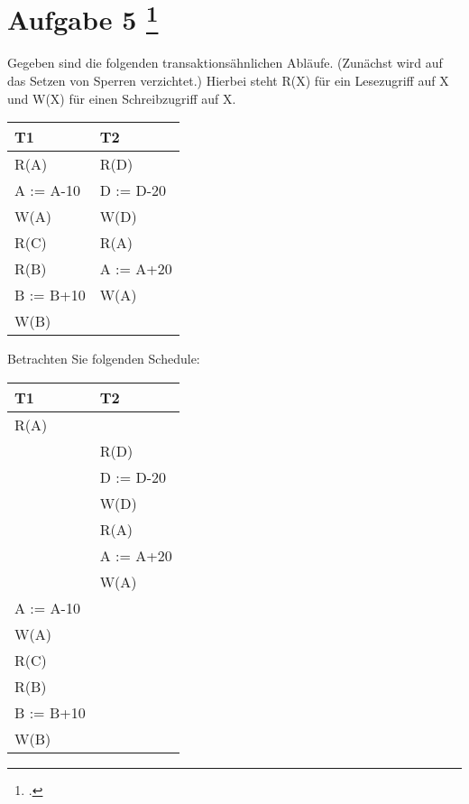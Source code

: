 \documentclass{lehramt-informatik-aufgabe}
\begin{document}
\liAufgabenTitel{}
\section{Aufgabe 5
\footcite{66116:2021:03}}

Gegeben sind die folgenden transaktionsähnlichen Abläufe. (Zunächst wird
auf das Setzen von Sperren verzichtet.) Hierbei steht R(X) für ein
Lesezugriff auf X und W(X) für einen Schreibzugriff auf X.

\begin{center}
\begin{tabular}{|l|l|}
\hline
T1 & T2 \\\hline
R(A) & R(D) \\
A := A-10 & D := D-20 \\
W(A) & W(D) \\
R(C)   & R(A) \\
R(B) & A := A+20 \\
B := B+10 & W(A) \\
W(B)      &
\\\hline
\end{tabular}
\end{center}

\noindent
Betrachten Sie folgenden Schedule:

\begin{center}
\begin{tabular}{|l|l|}
\hline
T1 & T2 \\\hline

R(A) & \\

& R(D) \\
& D := D-20 \\
& W(D) \\
& R(A) \\
& A := A+20 \\
& W(A) \\

A := A-10 & \\
W(A) & \\
R(C) & \\
R(B) & \\
B := B+10 & \\
W(B) & \\\hline
\end{tabular}
\end{center}
\end{document}
